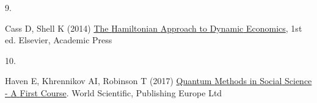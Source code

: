 \documentclass[
  letterpaper,
  DIV=11,
  numbers=noendperiod]{scrartcl}
\newlength{\cslhangindent}
\newlength{\csllabelwidth}
\newenvironment{CSLReferences}[2] %
 {\begin{list}{}{%
  \setlength{\itemindent}{0pt}
  \setlength{\leftmargin}{0pt}
  \setlength{\parsep}{0pt}
  \ifodd #1
   \setlength{\leftmargin}{\cslhangindent}
   \setlength{\itemindent}{-1\cslhangindent}
  \fi
  \setlength{\itemsep}{#2\baselineskip}}}
 {\end{list}}
\newcommand{\CSLLeftMargin}[1]{\parbox[t]{\csllabelwidth}{\strut#1\strut}}
\newcommand{\CSLRightInline}[1]{\parbox[t]{\linewidth - \csllabelwidth}{\strut#1\strut}}
\begin{document}
\begin{CSLReferences}{0}{1}
\CSLLeftMargin{9. }%
\CSLRightInline{Cass D, Shell K (2014)
\href{https://shop.elsevier.com/books/the-hamiltonian-approach-to-dynamic-economics/cass/978-0-12-163650-0}{The
{Hamiltonian} {Approach} to {Dynamic} {Economics}}, 1st ed. Elsevier,
Academic Press}

\CSLLeftMargin{10. }%
\CSLRightInline{Haven E, Khrennikov AI, Robinson T (2017)
\href{https://www.worldscientific.com/doi/epdf/10.1142/q0080}{Quantum
{Methods} in {Social} {Science} - {A} {First} {Course}}. World
Scientific, Publishing Europe Ltd}

\end{CSLReferences}



\printindex
\end{document}
